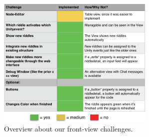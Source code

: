\begin{figure}[th]
	\centering
	\includegraphics[width=75mm,scale=0.75]{Figures/frontendOverview}
	\decoRule
	\caption[FrontViewTable]{Overview about our front-view challenges.}
	\label{fig:FrontViewTable}
\end{figure}



